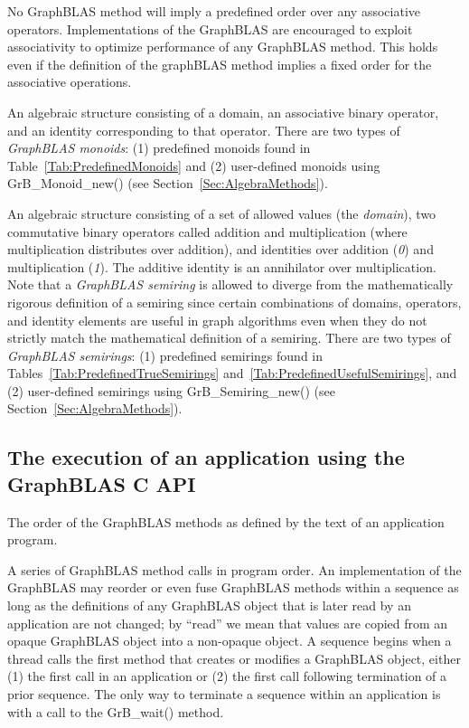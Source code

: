 No GraphBLAS method will imply a predefined order over any associative operators. Implementations of the GraphBLAS are encouraged to exploit associativity to optimize performance of any GraphBLAS method. This holds even if the definition of the graphBLAS method implies a fixed order for the associative operations.

 An algebraic structure consisting of a domain, an associative 
binary operator, and an identity corresponding to that operator.  There are two types 
of \emph{GraphBLAS monoids}: (1) predefined monoids found in 
Table~\ref{Tab:PredefinedMonoids} and (2) user-defined monoids using 
{\sf GrB\_Monoid\_new()} (see Section~\ref{Sec:AlgebraMethods}). 

 An algebraic structure consisting of a set of allowed values
(the \emph{domain}), two commutative binary operators called addition 
and multiplication (where multiplication distributes over addition),
and identities over addition (\emph{0}) and multiplication (\emph{1}).  The additive
identity is an annihilator over multiplication.   
Note that a \emph{GraphBLAS semiring} is allowed to diverge from the mathematically 
rigorous definition of a semiring since certain combinations of domains, operators, and identity 
elements are useful in graph algorithms even when they do not strictly match the mathematical
definition of a semiring.
There are two types 
of \emph{GraphBLAS semirings}: (1) predefined semirings found in 
Tables~\ref{Tab:PredefinedTrueSemirings} and~\ref{Tab:PredefinedUsefulSemirings}, and (2) user-defined semirings using 
{\sf GrB\_Semiring\_new()} (see Section~\ref{Sec:AlgebraMethods}). 
\glossEnd

\subsection{The execution of an application using the GraphBLAS C API}
\glossBegin
{} The order of the GraphBLAS methods as defined by the 
text of an application program.

 A series of GraphBLAS method calls in program order.  
An implementation of the GraphBLAS may reorder or even fuse GraphBLAS methods within a 
sequence as long as the definitions of any GraphBLAS object that is later read by an application 
are not changed; by ``read'' we mean that values are copied from an opaque GraphBLAS 
object into a non-opaque object.  A sequence begins when a thread calls the first method that creates
or modifies a GraphBLAS object, either (1) the first call in an application or (2) the first call 
following termination of a prior sequence.  The only way to terminate a sequence within an 
application is with a call to the {\sf GrB\_wait()} method. 

